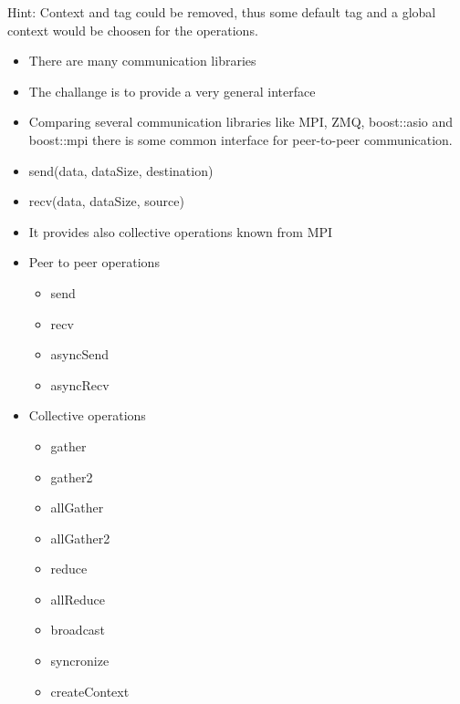 Hint: Context and tag could be removed, thus some default tag and a
global context would be choosen for the operations.



\begin{itemize}
\item There are many communication libraries
\item The challange is to provide a very general interface
\item Comparing several communication libraries like MPI, ZMQ,
  boost::asio and boost::mpi there is some common interface for
  peer-to-peer communication.
\item send(data, dataSize, destination)
\item recv(data, dataSize, source)
\item It provides also collective operations known from MPI
\end{itemize}

\begin{itemize}
\item Peer to peer operations
  \begin{itemize}
  \item send
  \item recv
  \item asyncSend
  \item asyncRecv
  \end{itemize}
\end{itemize}

\begin{itemize}
\item Collective operations
  \begin{itemize}
    \item gather
    \item gather2
    \item allGather
    \item allGather2
    \item reduce
    \item allReduce
    \item broadcast
    \item syncronize
    \item createContext
  \end{itemize}

\end{itemize}

